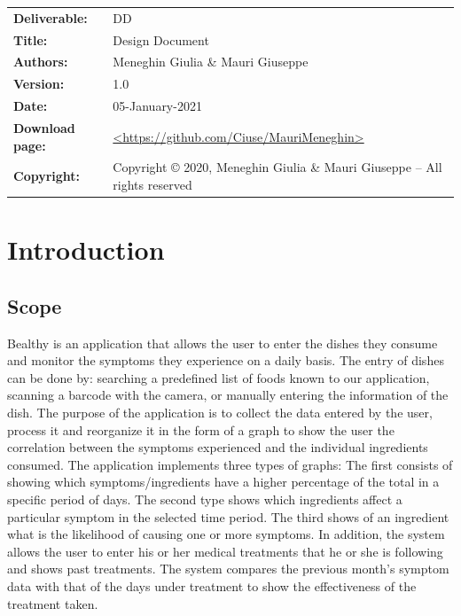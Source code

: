 \documentclass [12pt]{article}
\begin{document}
\begin{table}[h!]
\begin{tabu} to \textwidth { X[0.3,r,p] X[0.7,l,p] }
\hline

\textbf{Deliverable:} & DD\\
\textbf{Title:} & Design Document \\
\textbf{Authors:} & Meneghin Giulia \& Mauri Giuseppe \\
\textbf{Version:} & 1.0 \\ 
\textbf{Date:} & 05-January-2021 \\
\textbf{Download page:} & \url{<https://github.com/Ciuse/MauriMeneghin>} \\
\textbf{Copyright:} & Copyright © 2020, Meneghin Giulia \& Mauri Giuseppe – All rights reserved \\
\hline
\end{tabu}
\end{table}

\clearpage

\tableofcontents

\section{Introduction}
\subsection{Scope}
Bealthy is an application that allows the user to enter the dishes they consume and monitor the symptoms they experience on a daily basis. 
The entry of dishes can be done by: searching a predefined list of foods known to our application, scanning a barcode with the camera, or manually entering the information of the dish.
The purpose of the application is to collect the data entered by the user, process it and reorganize it in the form of a graph to show the user the correlation between the symptoms experienced and the individual ingredients consumed.
The application implements three types of graphs:
The first consists of showing which symptoms/ingredients have a higher percentage of the total in a specific period of days.
The second type shows which ingredients affect a particular symptom in the selected time period.
The third shows of an ingredient what is the likelihood of causing one or more symptoms.
In addition, the system allows the user to enter his or her medical treatments that he or she is following and shows past treatments.
The system compares the previous month's symptom data with that of the days under treatment to show the effectiveness of the treatment taken.
\end{document}
